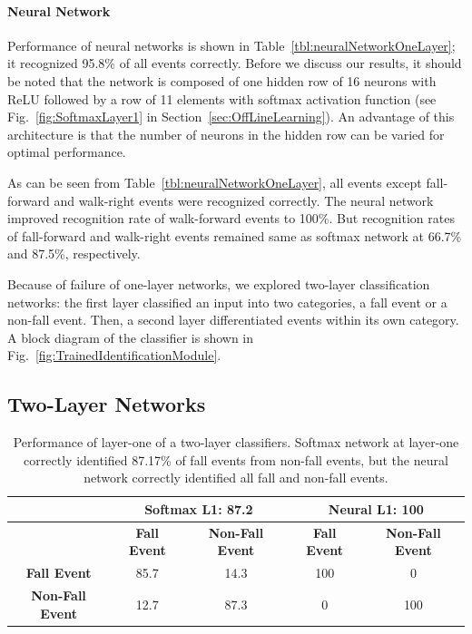 \documentclass[]{IEEEtran}
\begin{document}
\paragraph{Neural Network} \label{sec:NeuralNetwork2} Performance of neural
networks is shown in Table~\ref{tbl:neuralNetworkOneLayer}; it recognized
95.8\% of all events correctly. Before we discuss our results, it should be
noted that the network is composed of one hidden row of  16 neurons with ReLU
followed by a row of 11 elements with softmax activation function (see
Fig.~\ref{fig:SoftmaxLayer1} in Section~\ref{sec:OffLineLearning}). An
advantage of this architecture is that the number of neurons in the hidden row
can be varied for optimal performance.

\par As can be seen from Table~\ref{tbl:neuralNetworkOneLayer}, all events
except fall-forward and walk-right events were recognized correctly. The neural
network improved recognition rate of walk-forward events to 100\%. But
recognition rates of fall-forward and walk-right events remained same as
softmax network at 66.7\% and 87.5\%, respectively.  \par Because of failure of
one-layer networks, we explored two-layer classification networks: the first
layer classified an input into two categories, a fall event or a non-fall
event. Then, a second layer  differentiated events within its own category. A
block diagram of the classifier  is shown in
Fig.~\ref{fig:TrainedIdentificationModule}.
\subsection{Two-Layer Networks}
\label{sec:TwoLayerNetworks}
\begin{table}[htb]
\caption{ Performance of layer-one of a two-layer classifiers. Softmax network
at layer-one correctly identified 87.17\% of fall events from non-fall events,
but the neural network correctly identified all fall and non-fall events.}
\label{tbl:layer1RecognitionRates}
\resizebox{\columnwidth}{!}
{
\begin{tabular}{|c|c|c||c|c|}
\hline
& \multicolumn{2}{c||}{\bf Softmax L1: 87.2} & \multicolumn{2}{c|}{\bf Neural L1: 
100} \\ \hline
& \textbf{Fall Event} & \textbf{Non-Fall Event}  & \textbf{Fall Event} & \textbf{Non-Fall 
Event} \\ \hline
\textbf{Fall Event} & 85.7 &  14.3  & 100 &  0 \\ \hline
\textbf{Non-Fall Event} & 12.7 &  87.3 & 0 &  100 \\ \hline
\end{tabular}
}
\end{table}
\end{document}
